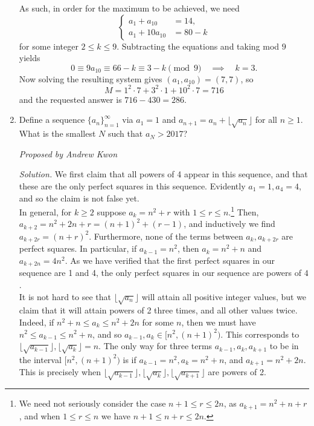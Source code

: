 \documentclass[10pt]{article}
\newcommand{\proposed}[1]
{
\vspace{5pt}
\noindent\textit{Proposed by #1}
}
\newcommand{\solution}
{
\vspace{5pt}
\noindent\textit{Solution.}\qquad
}
\begin{document}
\begin{enumerate}
\par As such, in order for the maximum to be achieved, we need \[\begin{cases}a_1+a_{10}&=14,\\a_1+10a_{10}&=80-k\end{cases}\] for some integer $2\leq k\leq 9$.  Subtracting the equations and taking mod $9$ yields \[0\equiv 9a_{10}\equiv 66-k\equiv 3-k\pmod 9\quad\implies\quad k=3.\] Now solving the resulting system gives $(a_1,a_{10}) = (7,7)$, so \[M = 1^2\cdot 7 + 3^2\cdot 1 + 10^2\cdot 7 = 716\] and the requested answer is $716 - 430 = \boxed{286}$.

\item Define a sequence $\{a_{n}\}_{n=1}^{\infty}$ via $a_{1} = 1$ and $a_{n+1} = a_{n} + \lfloor \sqrt{a_{n}} \rfloor$ for all $n \geq 1$. What is the smallest $N$ such that $a_{N} > 2017$?

	\proposed{Andrew Kwon}

	\solution We first claim that all powers of 4 appear in this sequence, and that these are the only perfect squares in this sequence. Evidently $a_{1} = 1, a_{4} = 4$, and so the claim is not false yet.\\

	In general, for $k \geq 2$ suppose $a_{k} = n^{2} + r$ with $1 \leq r \leq n$.\footnote{We need not seriously consider the case $n + 1 \leq r \leq 2n$, as $a_{k+1} = n^{2} + n + r$, and when $1 \leq r \leq n$ we have $n+ 1 \leq n + r \leq 2n$.} Then, $a_{k+2} = n^{2} + 2n + r = (n+1)^{2} + (r-1)$, and inductively we find $a_{k + 2r} = (n+r)^{2}$. Furthermore, none of the terms between $a_{k}, a_{k+2r}$ are perfect squares. In particular, if $a_{k-1} = n^{2}$, then $a_{k} = n^{2} + n$ and $a_{k + 2n} = 4n^{2}$. As we have verified that the first perfect squares in our sequence are 1 and 4, the only perfect squares in our sequence are powers of $4$.\\

	It is not hard to see that $\lfloor \sqrt{a_{n}} \rfloor$ will attain all positive integer values, but we claim that it will attain powers of 2 three times, and all other values twice. Indeed, if $n^{2} + n \leq a_{k} \leq n^{2} + 2n$ for some $n$, then we must have $n^{2} \leq a_{k-1} \leq n^{2} + n$, and so $a_{k-1}, a_{k} \in [n^{2}, (n+1)^{2})$. This corresponds to $\lfloor \sqrt{a_{k-1}}\rfloor, \lfloor \sqrt{a_{k}}\rfloor = n$. The only way for three terms $a_{k-1}, a_{k}, a_{k+1}$ to be in the interval $[n^{2}, (n+1)^{2})$ is if $a_{k-1} = n^{2}, a_{k} = n^{2} + n$, and $a_{k+1} = n^{2} + 2n$. This is precisely when $\lfloor \sqrt{a_{k-1}} \rfloor, \lfloor \sqrt{a_{k}}\rfloor, \lfloor\sqrt{a_{k+1}}\rfloor$ are powers of 2.\\


\end{enumerate}
\end{document}
